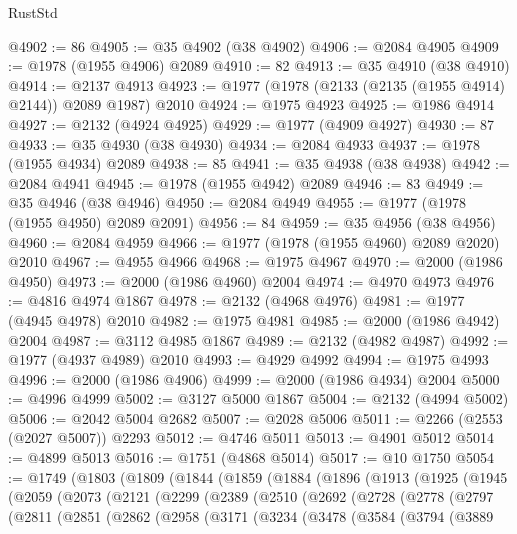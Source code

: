 \begin{lexlean}{RustStd}
\begin{coremodule}
@4902 := 86
@4905 := @35 @4902 (@38 @4902)
@4906 := @2084 @4905
@4909 := @1978 (@1955 @4906) @2089
@4910 := 82
@4913 := @35 @4910 (@38 @4910)
@4914 := @2137 @4913
@4923 := @1977 (@1978 (@2133 (@2135 (@1955 @4914) @2144)) @2089 @1987) @2010
@4924 := @1975 @4923
@4925 := @1986 @4914
@4927 := @2132 (@4924 @4925)
@4929 := @1977 (@4909 @4927)
@4930 := 87
@4933 := @35 @4930 (@38 @4930)
@4934 := @2084 @4933
@4937 := @1978 (@1955 @4934) @2089
@4938 := 85
@4941 := @35 @4938 (@38 @4938)
@4942 := @2084 @4941
@4945 := @1978 (@1955 @4942) @2089
@4946 := 83
@4949 := @35 @4946 (@38 @4946)
@4950 := @2084 @4949
@4955 := @1977 (@1978 (@1955 @4950) @2089 @2091)
@4956 := 84
@4959 := @35 @4956 (@38 @4956)
@4960 := @2084 @4959
@4966 := @1977 (@1978 (@1955 @4960) @2089 @2020) @2010
@4967 := @4955 @4966
@4968 := @1975 @4967
@4970 := @2000 (@1986 @4950)
@4973 := @2000 (@1986 @4960) @2004
@4974 := @4970 @4973
@4976 := @4816 @4974 @1867
@4978 := @2132 (@4968 @4976)
@4981 := @1977 (@4945 @4978) @2010
@4982 := @1975 @4981
@4985 := @2000 (@1986 @4942) @2004
@4987 := @3112 @4985 @1867
@4989 := @2132 (@4982 @4987)
@4992 := @1977 (@4937 @4989) @2010
@4993 := @4929 @4992
@4994 := @1975 @4993
@4996 := @2000 (@1986 @4906)
@4999 := @2000 (@1986 @4934) @2004
@5000 := @4996 @4999
@5002 := @3127 @5000 @1867
@5004 := @2132 (@4994 @5002)
@5006 := @2042 @5004 @2682
@5007 := @2028 @5006
@5011 := @2266 (@2553 (@2027 @5007)) @2293
@5012 := @4746 @5011
@5013 := @4901 @5012
@5014 := @4899 @5013
@5016 := @1751 (@4868 @5014)
@5017 := @10 @1750
@5054 := @1749
    (@1803
      (@1809
        (@1844
          (@1859
            (@1884
              (@1896
                (@1913
                  (@1925
                    (@1945
                      (@2059
                        (@2073
                          (@2121
                            (@2299
                              (@2389
                                (@2510
                                  (@2692
                                    (@2728
                                      (@2778
                                        (@2797
                                          (@2811
                                            (@2851
                                              (@2862
                                                (@2958
                                                  (@3171
                                                    (@3234
                                                      (@3478
                                                        (@3584
                                                          (@3794
                                                            (@3889

\end{coremodule}
\end{lexlean}
